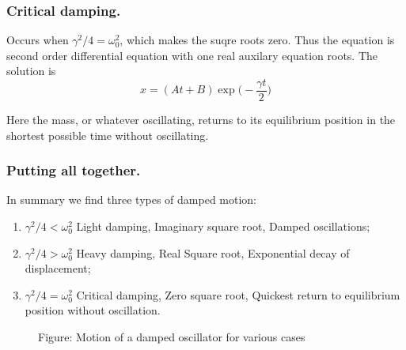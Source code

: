 \documentclass[../../../main.tex]{subfiles}
\begin{document}
\subsubsection*{Critical damping.} Occurs when $\gamma^2/4 = \omega_0^2$, which makes the suqre roots zero. Thus the equation is second order differential equation with one real auxilary equation roots. The solution is
\begin{equation*}
    x=(At+B)\exp\biggl(-\frac{\gamma t}{2}\biggr)
\end{equation*}

Here the mass, or whatever oscillating, returns to its equilibrium position in the shortest possible time without oscillating. 

\subsubsection*{Putting all together.} In summary we find three types of damped motion:
\begin{enumerate}
    \item $\gamma^2/4<\omega_0^2$ Light damping, Imaginary square root, Damped oscillations;
    \item $\gamma^2/4>\omega_0^2$ Heavy damping, Real Square root, Exponential decay of displacement;
    \item $\gamma^2/4=\omega_0^2$ Critical damping, Zero square root, Quickest return to equilibrium position without oscillation.
\end{enumerate} 
\begin{figure*}[h]
    \centering
    \caption*{Figure: Motion of a damped oscillator for various cases}
\end{figure*}
\end{document}
